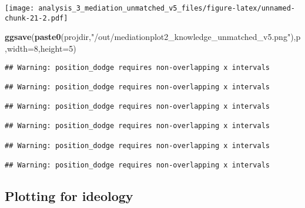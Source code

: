 \documentclass[
]{article}
\newenvironment{Shaded}{\begin{snugshade}}{\end{snugshade}}
\newcommand{\DataTypeTok}[1]{\textcolor[rgb]{0.13,0.29,0.53}{#1}}
\newcommand{\DecValTok}[1]{\textcolor[rgb]{0.00,0.00,0.81}{#1}}
\newcommand{\KeywordTok}[1]{\textcolor[rgb]{0.13,0.29,0.53}{\textbf{#1}}}
\newcommand{\NormalTok}[1]{#1}
\newcommand{\StringTok}[1]{\textcolor[rgb]{0.31,0.60,0.02}{#1}}
\begin{document}
\texttt{[image: analysis\_3\_mediation\_unmatched\_v5\_files/figure-latex/unnamed-chunk-21-2.pdf]}

\begin{Shaded}
\begin{Highlighting}[]
\KeywordTok{ggsave}\NormalTok{(}\KeywordTok{paste0}\NormalTok{(projdir,}\StringTok{"/out/mediationplot2_knowledge_unmatched_v5.png"}\NormalTok{),p,}\DataTypeTok{width=}\DecValTok{8}\NormalTok{,}\DataTypeTok{height=}\DecValTok{5}\NormalTok{)}
\end{Highlighting}
\end{Shaded}

\begin{verbatim}
## Warning: position_dodge requires non-overlapping x intervals

## Warning: position_dodge requires non-overlapping x intervals

## Warning: position_dodge requires non-overlapping x intervals

## Warning: position_dodge requires non-overlapping x intervals

## Warning: position_dodge requires non-overlapping x intervals

## Warning: position_dodge requires non-overlapping x intervals
\end{verbatim}

\hypertarget{plotting-for-ideology}{%
\subsection{Plotting for ideology}\label{plotting-for-ideology}}
\end{document}
